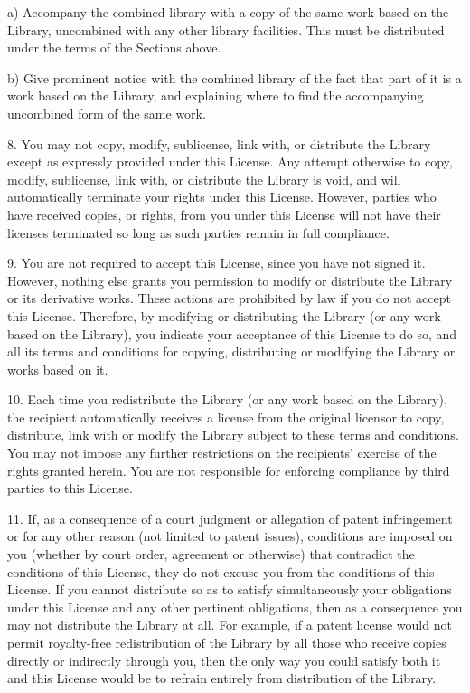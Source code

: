 \documentclass[twoside]{tceusermanual}
\begin{document}
    a) Accompany the combined library with a copy of the same work
    based on the Library, uncombined with any other library
    facilities.  This must be distributed under the terms of the
    Sections above.

    b) Give prominent notice with the combined library of the fact
    that part of it is a work based on the Library, and explaining
    where to find the accompanying uncombined form of the same work.

8. You may not copy, modify, sublicense, link with, or
distribute the Library except as expressly provided under this
License.  Any attempt otherwise to copy, modify, sublicense,
link with, or distribute the Library is void, and will
automatically terminate your rights under this License.
However, parties who have received copies, or rights, from you
under this License will not have their licenses terminated so
long as such parties remain in full compliance.

9. You are not required to accept this License, since you have
not signed it.  However, nothing else grants you permission to
modify or distribute the Library or its derivative works.  These
actions are prohibited by law if you do not accept this
License.  Therefore, by modifying or distributing the Library
(or any work based on the Library), you indicate your acceptance
of this License to do so, and all its terms and conditions for
copying, distributing or modifying the Library or works based on
it.

10. Each time you redistribute the Library (or any work based on
the Library), the recipient automatically receives a license
from the original licensor to copy, distribute, link with or
modify the Library subject to these terms and conditions.  You
may not impose any further restrictions on the recipients'
exercise of the rights granted herein. You are not responsible
for enforcing compliance by third parties to this License.
 
11. If, as a consequence of a court judgment or allegation of
patent infringement or for any other reason (not limited to
patent issues), conditions are imposed on you (whether by court
order, agreement or otherwise) that contradict the conditions of
this License, they do not excuse you from the conditions of this
License.  If you cannot distribute so as to satisfy
simultaneously your obligations under this License and any other
pertinent obligations, then as a consequence you may not
distribute the Library at all.  For example, if a patent license
would not permit royalty-free redistribution of the Library by
all those who receive copies directly or indirectly through you,
then the only way you could satisfy both it and this License
would be to refrain entirely from distribution of the Library.
\end{document}
